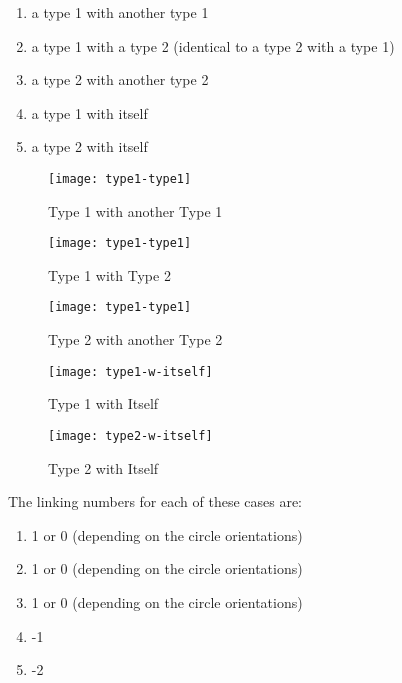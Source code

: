 \documentclass[10pt,a4paper]{report}
\theoremstyle{definition}
\theoremstyle{remark}
\theoremstyle{example}
\begin{document}
\begin{enumerate}
\item a type 1 with another type 1 
\item a type 1 with a type 2 (identical to a type 2 with a type 1) 
\item a type 2 with another type 2 
\item a type 1 with itself 
\item a type 2 with itself 
\end{enumerate}

\begin{figure}[H]
\centering
\graphicspath{{/Users/Imogen/Desktop/seifertimages/lapath/}}
\texttt{[image: type1-type1]}
\caption{Type 1 with another Type 1}
\label{type1-type1}
\end{figure}

\begin{figure}[H]
\centering
\graphicspath{{/Users/Imogen/Desktop/seifertimages/lapath/}}
\texttt{[image: type1-type1]}
\caption{Type 1 with Type 2}
\label{type1-type2}
\end{figure}

\begin{figure}[H]
\centering
\graphicspath{{/Users/Imogen/Desktop/seifertimages/lapath/}}
\texttt{[image: type1-type1]}
\caption{Type 2 with another Type 2}
\label{type2-type2}
\end{figure}

\begin{figure}[H]
\centering
\graphicspath{{/Users/Imogen/Desktop/seifertimages/lapath/}}
\texttt{[image: type1-w-itself]}
\caption{Type 1 with Itself}
\label{type1-w-itself}
\end{figure}

\begin{figure}[H]
\centering
\graphicspath{{/Users/Imogen/Desktop/seifertimages/lapath/}}
\texttt{[image: type2-w-itself]}
\caption{Type 2 with Itself}
\label{type2-w-itself}
\end{figure}

The linking numbers for each of these cases are:
\begin{enumerate}
\item 1 or 0 (depending on the circle orientations)
\item 1 or 0 (depending on the circle orientations)
\item 1 or 0 (depending on the circle orientations)
\item -1
\item -2
\end{enumerate}
\end{document}
